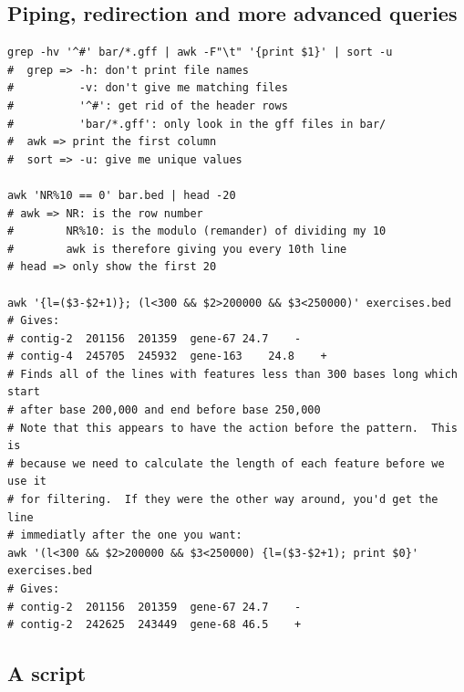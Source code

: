 \documentclass[11pt]{article}
\begin{document}
\hypertarget{piping-redirection-and-more-advanced-queries}{%
\subsection{Piping, redirection and more advanced
queries}\label{piping-redirection-and-more-advanced-queries}}

\begin{verbatim}
grep -hv '^#' bar/*.gff | awk -F"\t" '{print $1}' | sort -u
#  grep => -h: don't print file names
#          -v: don't give me matching files
#          '^#': get rid of the header rows
#          'bar/*.gff': only look in the gff files in bar/
#  awk => print the first column
#  sort => -u: give me unique values

awk 'NR%10 == 0' bar.bed | head -20
# awk => NR: is the row number
#        NR%10: is the modulo (remander) of dividing my 10
#        awk is therefore giving you every 10th line
# head => only show the first 20

awk '{l=($3-$2+1)}; (l<300 && $2>200000 && $3<250000)' exercises.bed
# Gives:
# contig-2  201156  201359  gene-67 24.7    -
# contig-4  245705  245932  gene-163    24.8    +
# Finds all of the lines with features less than 300 bases long which start
# after base 200,000 and end before base 250,000
# Note that this appears to have the action before the pattern.  This is
# because we need to calculate the length of each feature before we use it
# for filtering.  If they were the other way around, you'd get the line
# immediatly after the one you want:
awk '(l<300 && $2>200000 && $3<250000) {l=($3-$2+1); print $0}' exercises.bed
# Gives:
# contig-2  201156  201359  gene-67 24.7    -
# contig-2  242625  243449  gene-68 46.5    +
\end{verbatim}

\hypertarget{a-script}{%
\subsection{A script}\label{a-script}}
\end{document}

